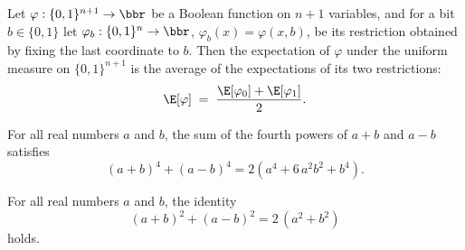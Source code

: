 \begin{lemma}
\leanok
{}
\label{BooleanAnalysis.Hypercontractivity.expect_succ_eq}
Let $\varphi : \{0,1\}^{n+1} \to \bbr$ be a Boolean function on $n+1$ variables, and for
a bit $b \in \{0,1\}$ let $\varphi_b : \{0,1\}^n \to \bbr$, $\varphi_b(x) = \varphi(x,
b)$, be its restriction obtained by fixing the last coordinate to $b$. Then the
expectation of $\varphi$ under the uniform measure on $\{0,1\}^{n+1}$ is the average of
the expectations of its two restrictions:
\[
  \E[\varphi] \;=\; \frac{\E[\varphi_{0}] + \E[\varphi_{1}]}{2}.
\]
\end{lemma}

\begin{lemma}
\leanok
{}
\label{BooleanAnalysis.Hypercontractivity.fourth_pow_sum}
For all real numbers $a$ and $b$, the sum of the fourth powers of $a+b$ and $a-b$
satisfies
\[
(a+b)^4 + (a-b)^4 = 2\left(a^4 + 6\,a^2 b^2 + b^4\right).
\]
\end{lemma}

\begin{lemma}
\leanok
{}
\label{BooleanAnalysis.Hypercontractivity.second_pow_sum}
For all real numbers $a$ and $b$, the identity \[(a+b)^2 + (a-b)^2 = 2\,(a^2 + b^2)\]
holds.
\end{lemma}

